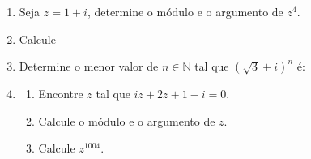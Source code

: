 \documentclass[a4paper,5pt]{amsbook}
\begin{document}
\vspace{1cm}
\begin{enumerate}
	\vspace{0.5cm}
	\item Seja $z=1+i$, determine o módulo e o argumento de $z^4$.

	\vspace{0.5cm}
	\item Calcule


	\vspace{0.5cm}
	\item Determine o menor valor de $n\in\mathbb{N}$ tal que ${(\sqrt{3}+i)}^n$ é:


	\vspace{0.5cm}
	\item
		\begin{enumerate}
			\item Encontre $z$ tal que $iz+2\bar{z} + 1 - i = 0$.
			\item Calcule o módulo e o argumento de $z$.
			\item Calcule $z^{1004}$.
		\end{enumerate}


\end{enumerate}
\end{document}

